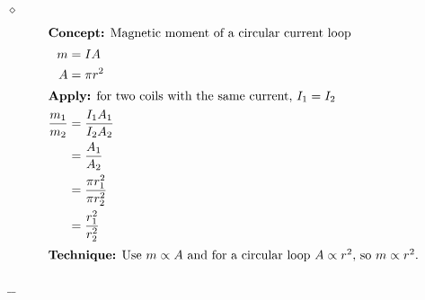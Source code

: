 \documentclass[preview, border={10mm, 5mm, 10mm, 10mm}]{standalone}
\title{\textsc{}}
\newenvironment{idea}{\par\noindent\color{violet!80!black}$\diamond$\enspace\ignorespaces}{\par}
\begin{document}
\begin{idea}
    \begin{align*}
    \intertext{\textbf{Concept:} Magnetic moment of a circular current loop}
    m &= IA \\
    A &= \pi r^2 \\
    \intertext{\textbf{Apply:} for two coils with the same current, $I_1=I_2$}
    \frac{m_1}{m_2} &= \frac{I_1A_1}{I_2A_2} \\
    &= \frac{A_1}{A_2} \\
    &= \frac{\pi r_1^2}{\pi r_2^2} \\
    &= \frac{r_1^2}{r_2^2} \\
    \intertext{\textbf{Technique:} Use $m \propto A$ and for a circular loop $A \propto r^2$, so $m \propto r^2$.}
    \end{align*}
\end{idea}
\hfill $\_\_$
\end{document}
